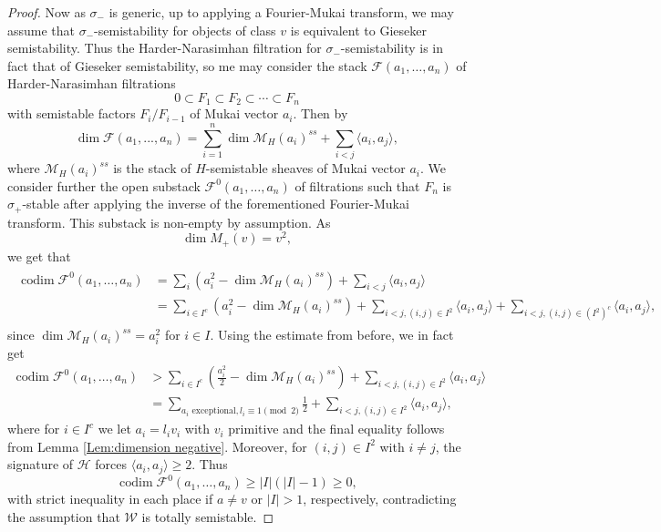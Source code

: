 \documentclass[leqno,11pt]{amsart}
\def\codim{\mathop{\mathrm{codim}}\nolimits}
\def\dim{\mathop{\mathrm{dim}}\nolimits}
\theoremstyle{definition}
\def\FF{\ensuremath{\mathcal F}}
\def\HH{\ensuremath{\mathcal H}}
\def\MM{\ensuremath{\mathcal M}}
\def\WW{\ensuremath{\mathcal W}}
\begin{document}
\begin{proof}
Now as $\sigma_-$ is generic, up to applying a Fourier-Mukai transform, we may assume that $\sigma_-$-semistability for objects of class $v$ is equivalent to Gieseker semistability.  Thus the Harder-Narasimhan filtration for $\sigma_-$-semistability is in fact that of Gieseker semistability, so me may consider the stack $\FF(a_1,\ldots,a_n)$ of Harder-Narasimhan filtrations $$0\subset F_1\subset F_2\subset \cdots\subset F_n$$ with semistable factors $F_i/F_{i-1}$ of Mukai vector $a_i$.  Then by \cite[Lemma 5.3]{KY08} $$\dim \FF(a_1,...,a_n)=\sum_{i=1}^n\dim\MM_H(a_i)^{ss}+
\sum_{i<j}\langle a_i,a_j\rangle,$$ where $\MM_H(a_i)^{ss}$ is the stack of $H$-semistable sheaves of Mukai vector $a_i$.  We consider further the open substack $\FF^0(a_1,\ldots,a_n)$ of filtrations such that $F_n$ is $\sigma_+$-stable after applying the inverse of the forementioned Fourier-Mukai transform.  This substack is non-empty by assumption.  As $$\dim M_+(v)=v^2,$$ we get that \begin{align}\label{codim estimate}
\begin{split}\codim\FF^0(a_1,\ldots,a_n)&=\sum_i (a_i^2-\dim\MM_H(a_i)^{ss})+\sum_{i<j}\langle a_i,a_j\rangle\\
&=\sum_{i\in I^c}(a_i^2-\dim\MM_H(a_i)^{ss})+\sum_{i<j,(i,j)\in I^2}\langle a_i,a_j\rangle+\sum_{i<j,(i,j)\in (I^2)^c}\langle a_i,a_j\rangle, 
\end{split}
\end{align}
since $\dim\MM_H(a_i)^{ss}=a_i^2$ for $i\in I$.  Using the estimate from before, we in fact get 
\begin{align*}
\codim\FF^0(a_1,\ldots,a_n)&> \sum_{i\in I^c}(\frac{a_i^2}{2}-\dim\MM_H(a_i)^{ss})+\sum_{i<j,(i,j)\in I^2}\langle a_i,a_j\rangle\\
&=\sum_{a_i\mbox{ exceptional}, l_i\equiv 1\pmod 2}\frac{1}{2}+\sum_{i<j,(i,j)\in I^2}\langle a_i,a_j\rangle,
\end{align*}
where for $i\in I^c$ we let $a_i=l_iv_i$ with $v_i$ primitive and the final equality follows from Lemma \ref{Lem:dimension negative}.  Moreover, for $(i,j)\in I^2$ with $i\neq j$, the signature of $\HH$ forces $\langle a_i,a_j\rangle\geq 2$.  Thus $$\codim\FF^0(a_1,\ldots,a_n)\geq|I|(|I|-1)\geq 0,$$ with strict inequality in each place if $a\neq v$ or $|I|>1$, respectively, contradicting the assumption that $\WW$ is totally semistable.  
\end{proof}
\end{document}
